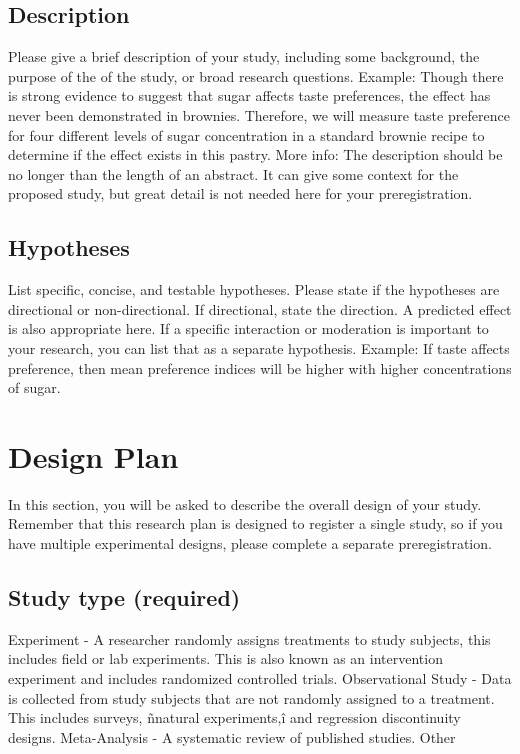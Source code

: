 \documentclass[
10pt, %
a4paper, %
oneside, %
headinclude,footinclude, %
BCOR5mm, %
]{scrartcl}
\begin{document}
\subsection{Description}
Please give a brief description of your study, including some background, the purpose of the of the study, or broad research questions. 
Example: Though there is strong evidence to suggest that sugar affects taste preferences, the effect has never been demonstrated in brownies. Therefore, we will measure taste preference for four different levels of sugar concentration in a standard brownie recipe to determine if the effect exists in this pastry. 
More info: The description should be no longer than the length of an abstract. It can give some context for the proposed study, but great detail is not needed here for your preregistration.


\subsection{Hypotheses}
List specific, concise, and testable hypotheses. Please state if the hypotheses are directional or non-directional. If directional, state the direction. A predicted effect is also appropriate here. If a specific interaction or moderation is important to your research, you can list that as a separate hypothesis. 
Example: If taste affects preference, then mean preference indices will be higher with higher concentrations of sugar. 


\section{Design Plan}

In this section, you will be asked to describe the overall design of your study. Remember that this research plan is designed to register a single study, so if you have multiple experimental designs, please complete a separate preregistration.

\subsection{Study type (required)}
Experiment - A researcher randomly assigns treatments to study subjects, this includes field or lab experiments. This is also known as an intervention experiment and includes randomized controlled trials.
Observational Study - Data is collected from study subjects that are not randomly assigned to a treatment. This includes surveys, ñnatural experiments,î and regression discontinuity designs.
Meta-Analysis - A systematic review of published studies.
Other 
\end{document}
